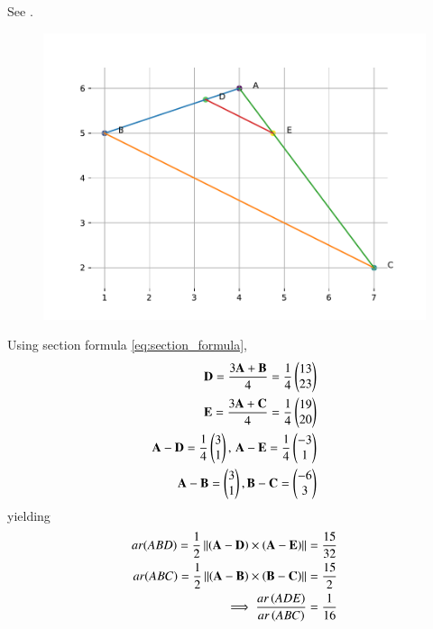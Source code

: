 See  
.
\begin{figure}[H]
 \begin{center}
 \includegraphics[width=0.75\columnwidth]{chapters/10/7/4/6/figs/fig.pdf}
 \end{center}
\caption{}
\label{fig:chapters/10/7/4/6Fig1}
\end{figure}
	Using section formula
	  \eqref{eq:section_formula},
\begin{align}
\mathbf{D} =\frac{3\mathbf{A}+\mathbf{B}}{4}
	=\frac{1}{4}\begin{pmatrix}13\\ 23\end{pmatrix}
	\\
\mathbf{E} =\frac{3\mathbf{A}+\mathbf{C}}{4}
	=\frac{1}{4}\begin{pmatrix}19\\ 20\end{pmatrix}
	\\
	\mathbf{A}- \mathbf{D} 
	=\frac{1}{4}\begin{pmatrix}3\\ 1\end{pmatrix},\,
	  \mathbf{A}- \mathbf{E}  
	=\frac{1}{4}\begin{pmatrix}-3\\ 1\end{pmatrix}
	\\
	\mathbf{A}- \mathbf{B} =\begin{pmatrix}3\\1\end{pmatrix},
	  \mathbf{B}-\mathbf{C} =\begin{pmatrix}-6\\3\end{pmatrix}
\end{align}
yielding
\begin{align}
ar(ABD) =\frac{1}{2} \left\lVert\left(\mathbf{A}-\mathbf{D}\right)  \times 
   \left(\mathbf{A}- \mathbf{E}\right)\right\rVert 
	=	\frac{15}{32}
	\\
	  ar(ABC) =\frac{1}{2} \left\lVert\left(\mathbf{A}-\mathbf{B}\right)  \times 
   \left(\mathbf{B}- \mathbf{C}\right)\right\rVert 
	=	\frac{15}{2}
	\\
	\implies \frac{ar\left(ADE\right)}{ar\left(ABC\right)}=\frac{1}{16}
\end{align}
